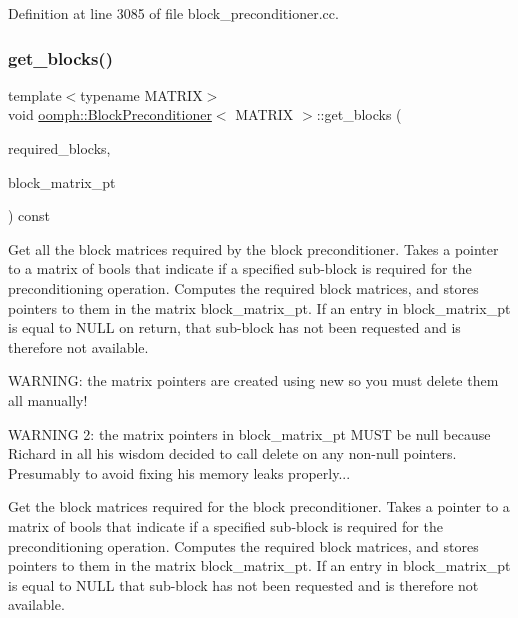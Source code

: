 Definition at line 3085 of file block\+\_\+preconditioner.\+cc.

\mbox{\label{classoomph_1_1BlockPreconditioner_af836bb2d105d80fb4bc584c2d99c06ed}} 
\subsubsection{\texorpdfstring{get\+\_\+blocks()}{get\_blocks()}}
{\footnotesize\ttfamily template$<$typename M\+A\+T\+R\+IX$>$ \\
void \hyperlink{classoomph_1_1BlockPreconditioner}{oomph\+::\+Block\+Preconditioner}$<$ M\+A\+T\+R\+IX $>$\+::get\+\_\+blocks (\begin{DoxyParamCaption}\item[{\hyperlink{classoomph_1_1DenseMatrix}{Dense\+Matrix}$<$ bool $>$ \&}]{required\+\_\+blocks,  }\item[{\hyperlink{classoomph_1_1DenseMatrix}{Dense\+Matrix}$<$ M\+A\+T\+R\+IX $\ast$$>$ \&}]{block\+\_\+matrix\+\_\+pt }\end{DoxyParamCaption}) const}



Get all the block matrices required by the block preconditioner. Takes a pointer to a matrix of bools that indicate if a specified sub-\/block is required for the preconditioning operation. Computes the required block matrices, and stores pointers to them in the matrix block\+\_\+matrix\+\_\+pt. If an entry in block\+\_\+matrix\+\_\+pt is equal to N\+U\+LL on return, that sub-\/block has not been requested and is therefore not available. 

W\+A\+R\+N\+I\+NG\+: the matrix pointers are created using new so you must delete them all manually!

W\+A\+R\+N\+I\+NG 2\+: the matrix pointers in block\+\_\+matrix\+\_\+pt M\+U\+ST be null because Richard in all his wisdom decided to call delete on any non-\/null pointers. Presumably to avoid fixing his memory leaks properly...

Get the block matrices required for the block preconditioner. Takes a pointer to a matrix of bools that indicate if a specified sub-\/block is required for the preconditioning operation. Computes the required block matrices, and stores pointers to them in the matrix block\+\_\+matrix\+\_\+pt. If an entry in block\+\_\+matrix\+\_\+pt is equal to N\+U\+LL that sub-\/block has not been requested and is therefore not available. 


